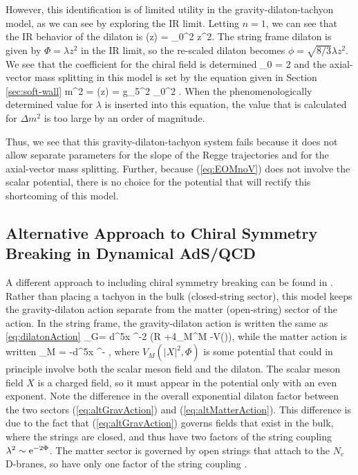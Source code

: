 However, this identification is of limited utility in the gravity-dilaton-tachyon model, as we can see by exploring the IR limit.
Letting $n=1$, we can see that the IR behavior of the dilaton is 
\be
\phi(z) = \chi_0^2 z^2.
\ee
The string frame dilaton is given by $\Phi = \lambda z^2$ in the IR limit, so the re-scaled dilaton becomes $\phi = \sqrt{8/3}\lambda z^2$.
We see that the coefficient for the chiral field is determined
\be
\chi_0 = 2 \sqrt{\lambda}
\ee
and the axial-vector mass splitting in this model is set by the equation given in Section \ref{sec:soft-wall} %
\be
\Delta m^2 = (z\rightarrow \infty) = g_5^2 \chi_0^2 .
\ee
When the phenomenologically determined value for $\lambda$ is inserted into this equation, the value that is calculated for $\Delta m^2$ is too large by an order of magnitude. 

Thus, we see that this gravity-dilaton-tachyon system fails because it does not allow separate parameters for the slope of the Regge trajectories and for the axial-vector mass splitting.
Further, because (\ref{eq:EOMnoV}) does not involve the scalar potential, there is no choice for the potential that will rectify this shortcoming of this model. 

\subsection{Alternative Approach to Chiral Symmetry Breaking in Dynamical AdS/QCD}

A different approach to including chiral symmetry breaking can be found in \cite{FILL-IN}. 
Rather than placing a tachyon in the bulk (closed-string sector), this model keeps the gravity-dilaton action separate from the matter (open-string) sector of the action.
In the string frame, the gravity-dilaton action is written the same as \ref{eq:dilatonAction}
\be
{}_G=  \int d^5x \root \EXP^{-2\Phi} \left(R +4\partial_M\partial^M -V(\Phi)\right), 
\label{eq:altGravAction}
\ee
while the matter action is written
\be
{}_M  = -\int d^5x \root \EXP^{-\Phi}  ,
\label{eq:altMatterAction}
\ee
where $V_M(|X|^2,\Phi)$ is some potential that could in principle involve both the scalar meson field and the dilaton.
The scalar meson field $X$ is a charged field, so it must  appear in the potential only with an even exponent.
Note the difference in the overall exponential dilaton factor between the two sectors (\ref{eq:altGravAction}) and (\ref{eq:altMatterAction}).
This difference is due to the fact that (\ref{eq:altGravAction}) governs fields that exist in the bulk, where the strings are closed, and thus have two factors of the string coupling $\lambda^2 \sim \mathrm{e}^{-2\Phi}$. 
The matter sector is governed by open strings that attach to the $N_c$ D-branes, so have only one factor of the string coupling \cite{FILL-IN}. 

